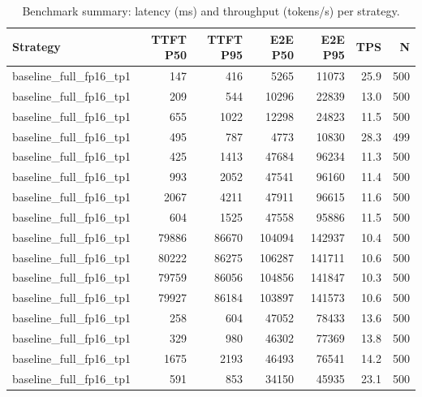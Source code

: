 \begin{table}
\caption{Benchmark summary: latency (ms) and throughput (tokens/s) per strategy.}
\label{tab:summary}
\begin{tabular}{lrrrrrr}
\toprule
Strategy & TTFT P50 & TTFT P95 & E2E P50 & E2E P95 & TPS & N \\
\midrule
baseline_full_fp16_tp1 & 147 & 416 & 5265 & 11073 & 25.9 & 500 \\
baseline_full_fp16_tp1 & 209 & 544 & 10296 & 22839 & 13.0 & 500 \\
baseline_full_fp16_tp1 & 655 & 1022 & 12298 & 24823 & 11.5 & 500 \\
baseline_full_fp16_tp1 & 495 & 787 & 4773 & 10830 & 28.3 & 499 \\
baseline_full_fp16_tp1 & 425 & 1413 & 47684 & 96234 & 11.3 & 500 \\
baseline_full_fp16_tp1 & 993 & 2052 & 47541 & 96160 & 11.4 & 500 \\
baseline_full_fp16_tp1 & 2067 & 4211 & 47911 & 96615 & 11.6 & 500 \\
baseline_full_fp16_tp1 & 604 & 1525 & 47558 & 95886 & 11.5 & 500 \\
baseline_full_fp16_tp1 & 79886 & 86670 & 104094 & 142937 & 10.4 & 500 \\
baseline_full_fp16_tp1 & 80222 & 86275 & 106287 & 141711 & 10.6 & 500 \\
baseline_full_fp16_tp1 & 79759 & 86056 & 104856 & 141847 & 10.3 & 500 \\
baseline_full_fp16_tp1 & 79927 & 86184 & 103897 & 141573 & 10.6 & 500 \\
baseline_full_fp16_tp1 & 258 & 604 & 47052 & 78433 & 13.6 & 500 \\
baseline_full_fp16_tp1 & 329 & 980 & 46302 & 77369 & 13.8 & 500 \\
baseline_full_fp16_tp1 & 1675 & 2193 & 46493 & 76541 & 14.2 & 500 \\
baseline_full_fp16_tp1 & 591 & 853 & 34150 & 45935 & 23.1 & 500 \\
\bottomrule
\end{tabular}
\end{table}
